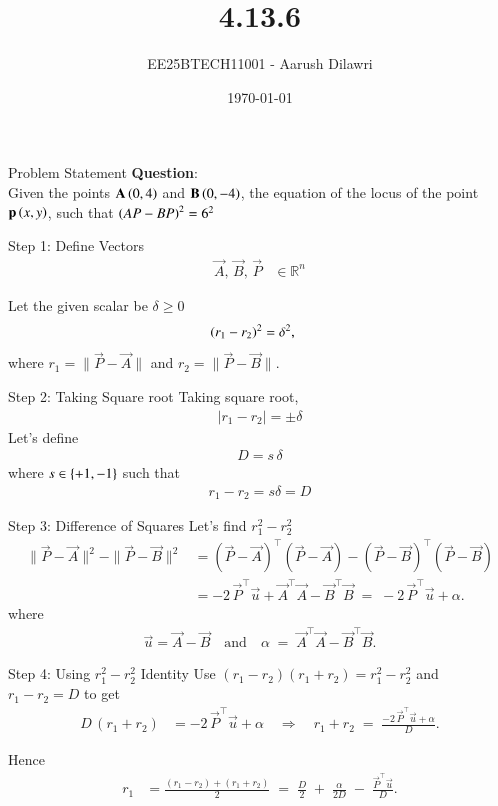 \documentclass{beamer}
\title{4.13.6}
\date{\today}
\author{EE25BTECH11001 - Aarush Dilawri}
\begin{document}
\frame{\titlepage}

\begin{frame}{Problem Statement}
\textbf{Question}:\\
Given the points $\mathbf{A} \left(0,4\right)$ and $\mathbf{B} \left(0,-4\right)$, the equation of the locus of the point $\mathbf{p}\left(x,y\right)$, such that $\left(AP -BP\right)^2 = 6^2$
\end{frame}

\begin{frame}{Step 1: Define Vectors}
\begin{align}
    \vec{A},\,\vec{B},\,\vec{P} &\in \mathbb{R}^n
\end{align}

Let the given scalar be $ \delta \ge 0 $ 
\begin{align}
    \left(r_1 - r_2\right)^2 &= \delta^2,
\end{align}
where $r_1=\|\vec{P}-\vec{A}\|$ and $r_2=\|\vec{P}-\vec{B}\|$.
\end{frame}

\begin{frame}{Step 2: Taking Square root}
Taking square root, 
\begin{align}
    \lvert r_1 - r_2 \rvert = \pm\delta
\end{align}
Let's define
\begin{align}
    D = s\,\delta
\end{align}
where $s\in \left\{+1,-1\right\}$ such that
\begin{align}
    r_1 -r_2 = s\delta = D
\end{align}
\end{frame}

\begin{frame}{Step 3: Difference of Squares}
Let's find $r_1^2 -r_2^2$
\begin{align}
    \|\vec{P}-\vec{A}\|^2 - \|\vec{P}-\vec{B}\|^2
    &= (\vec{P}-\vec{A})^\top(\vec{P}-\vec{A}) - (\vec{P}-\vec{B})^\top(\vec{P}-\vec{B}) \\
    &= -2\,\vec{P}^\top\vec{u} + \vec{A}^\top\vec{A} - \vec{B}^\top\vec{B}
    \;=\; -2\,\vec{P}^\top\vec{u} + \alpha .
\end{align}
where
\begin{align}
    \vec{u} = \vec{A} -\vec{B} \quad \text{and} \quad  \alpha \;=\; \vec{A}^\top\vec{A} - \vec{B}^\top\vec{B}.
\end{align}
\end{frame}

\begin{frame}{Step 4: Using $r_1^2 - r_2^2$ Identity}
Use $(r_1-r_2)(r_1+r_2)=r_1^2-r_2^2$ and $r_1-r_2 = D$ to get
\begin{align}
    D\,(r_1+r_2) &= -2\,\vec{P}^\top\vec{u} + \alpha
    \quad\Longrightarrow\quad
    r_1+r_2 \;=\; \frac{-2\,\vec{P}^\top\vec{u} + \alpha}{D}.
\end{align}

Hence
\begin{align}
    r_1 &= \frac{(r_1-r_2)+(r_1+r_2)}{2}
        \;=\; \frac{D}{2} \;+\; \frac{\alpha}{2D} \;-\; \frac{\vec{P}^\top\vec{u}}{D}.
\end{align}
\end{frame}
\end{document}

